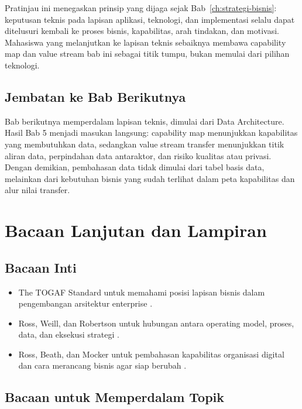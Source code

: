 Pratinjau ini menegaskan prinsip yang dijaga sejak Bab~\ref{ch:strategi-bisnis}:
keputusan teknis pada lapisan aplikasi, teknologi, dan implementasi selalu dapat
ditelusuri kembali ke proses bisnis, kapabilitas, arah tindakan, dan motivasi.
Mahasiswa yang melanjutkan ke lapisan teknis sebaiknya membawa capability map dan
value stream bab ini sebagai titik tumpu, bukan memulai dari pilihan teknologi.

\subsection*{Jembatan ke Bab Berikutnya}

Bab berikutnya memperdalam lapisan teknis, dimulai dari Data Architecture. Hasil
Bab 5 menjadi masukan langsung: capability map menunjukkan kapabilitas yang
membutuhkan data, sedangkan value stream transfer menunjukkan titik aliran data,
perpindahan data antaraktor, dan risiko kualitas atau privasi. Dengan demikian,
pembahasan data tidak dimulai dari tabel basis data, melainkan dari kebutuhan
bisnis yang sudah terlihat dalam peta kapabilitas dan alur nilai transfer.

\section{Bacaan Lanjutan dan Lampiran}

\subsection*{Bacaan Inti}

\begin{itemize}
  \item The TOGAF Standard untuk memahami posisi lapisan bisnis dalam
        pengembangan arsitektur enterprise \cite{togaf10}.
  \item Ross, Weill, dan Robertson untuk hubungan antara operating model,
        proses, data, dan eksekusi strategi \cite{ross2006enterprise}.
  \item Ross, Beath, dan Mocker untuk pembahasan kapabilitas organisasi digital
        dan cara merancang bisnis agar siap berubah \cite{ross2019designed}.
\end{itemize}

\subsection*{Bacaan untuk Memperdalam Topik}

